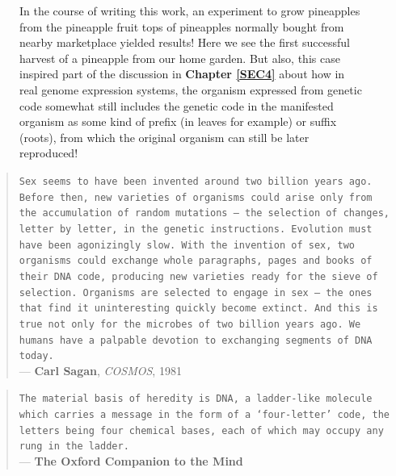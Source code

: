 \documentclass[a4paper, 18pt]{book} %
\begin{document}
\begin{figure}[H]
\begin{center}
   \caption{In the course of writing this work, an experiment to grow pineapples from the pineapple fruit tops of pineapples normally bought from nearby marketplace yielded results! Here we see the first successful harvest of a pineapple from our home garden. But also, this case inspired part of the discussion in \textbf{Chapter \ref{SEC4}} about how in real genome expression systems, the organism expressed from genetic code somewhat still includes the genetic code in the manifested organism as some kind of prefix (in leaves for example) or suffix (roots), from which the original organism can still be later reproduced!}
  \label{FIGPINEAPPLE}
  \end{center}
\end{figure}

\begin{quotation}
\noindent \texttt{Sex seems to have been invented around two billion years ago. Before then, new varieties of organisms could arise only from the accumulation of random mutations --- the selection of changes, letter by letter, in the genetic instructions. Evolution must have been agonizingly slow. With the invention of sex, two organisms could exchange whole paragraphs, pages and books of their DNA code, producing new varieties ready for the sieve of selection. Organisms are selected to engage in sex --- the ones that find it uninteresting quickly become extinct. And this is true not only for the microbes of two billion years ago. We humans have a palpable devotion to exchanging segments of DNA today.}\\
\hspace*{\fill} --- \textbf{Carl Sagan}, \textit{COSMOS}, 1981\cite{sagan1981cosmos}
\end{quotation}


\begin{quotation}
\noindent \texttt{The material basis of heredity is DNA, a ladder-like molecule which carries a message in the form of a `four-letter' code, the letters being four chemical bases, each of which may occupy any rung in the ladder.}\\
\hspace*{\fill} --- \textbf{The Oxford Companion to the Mind}\cite{gregory1987oxford}
\end{quotation}
\end{document}

